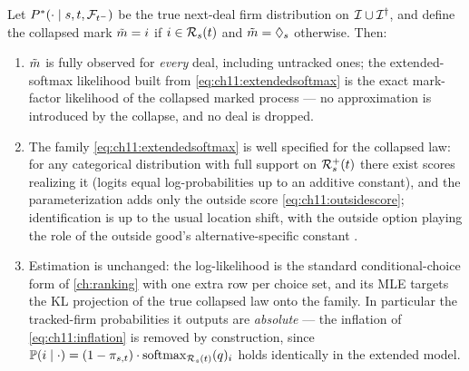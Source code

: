 \begin{proposition}\label{prop:ch11:collapse}
Let $P^{*}(\cdot \mid s,t,\mathcal{F}_{t^-})$ be the true next-deal firm distribution
on $\mathcal{I} \cup \mathcal{I}^{\dagger}$, and define the collapsed mark
$\tilde{m} = i$ if $i \in \mathcal{R}_s(t)$ and $\tilde{m} =
\lozenge_s$ otherwise. Then:
\begin{enumerate}[label=(\roman*)]
\item $\tilde{m}$ is fully observed for \emph{every} deal, including
untracked ones; the extended-softmax likelihood built from
\cref{eq:ch11:extendedsoftmax} is the exact mark-factor likelihood of the
collapsed marked process --- no approximation is introduced by the
collapse, and no deal is dropped.
\item The family \cref{eq:ch11:extendedsoftmax} is well specified for the
collapsed law: for any categorical distribution with full support on
$\mathcal{R}^{+}_s(t)$ there exist scores realizing it (logits equal
log-probabilities up to an additive constant), and the parameterization
adds only the outside score \cref{eq:ch11:outsidescore}; identification
is up to the usual location shift, with the outside option playing the
role of the outside good's alternative-specific constant
\citep{mcfadden1974,train2009}.
\item Estimation is unchanged: the log-likelihood is the standard
conditional-choice form of \cref{ch:ranking} with one extra row per
choice set, and its MLE targets the KL projection of the true collapsed
law onto the family. In particular the tracked-firm probabilities it
outputs are \emph{absolute} --- the inflation of
\cref{eq:ch11:inflation} is removed by construction, since
$\mathbb{P}(i \mid \cdot) = (1-\pi_{s,t}) \cdot
\mathrm{softmax}_{\mathcal{R}_s(t)}(q)_i$ holds identically in the
extended model.
\end{enumerate}
\end{proposition}

